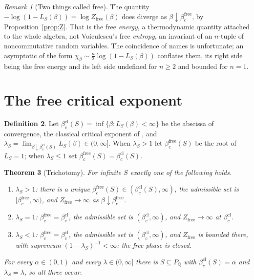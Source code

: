 \documentclass[11pt]{amsart}
\numberwithin{equation}{section}
\newtheorem{theorem}{Theorem}[section]
\theoremstyle{definition}
\newtheorem{definition}[theorem]{Definition}
\theoremstyle{remark}
\newtheorem{remark}[theorem]{Remark}
\newcommand{\Q}{\mathbb{Q}}
\newcommand{\bfree}{\beta_c^{\mathrm{free}}}
\newcommand{\bcl}{\beta_c^{\mathrm{cl}}}
\begin{document}
\begin{remark}[Two things called free]\label{rem:freeenergy}
The quantity $-\log(1-L_S(\beta))=\log Z_{\mathrm{free}}(\beta)$ does diverge as
$\beta\downarrow\bfree$, by Proposition~\ref{prop:Z}. That is the free \emph{energy}, a
thermodynamic quantity attached to the whole algebra, not Voiculescu's free \emph{entropy},
an invariant of an $n$-tuple of noncommutative random variables. The coincidence of names is
unfortunate; an asymptotic of the form $\chi_\beta\sim\frac n2\log(1-L_S(\beta))$ conflates
them, its right side being the free energy and its left side undefined for $n\ge2$ and
bounded for $n=1$.
\end{remark}

\section{The free critical exponent}

\begin{definition}\label{def:bfree}
Let $\bcl(S)=\inf\{\beta:L_S(\beta)<\infty\}$ be the abscissa of convergence, the classical
critical exponent of \cite{Main}, and
$\lambda_S=\lim_{\beta\downarrow\bcl(S)}L_S(\beta)\in(0,\infty]$. When $\lambda_S>1$ let
$\bfree(S)$ be the root of $L_S=1$; when $\lambda_S\le1$ set $\bfree(S)=\bcl(S)$.
\end{definition}

\begin{theorem}[Trichotomy]\label{thm:trich}
For infinite $S$ exactly one of the following holds.
\begin{enumerate}
\item[\textup{(S)}] $\lambda_S>1$: there is a unique $\bfree(S)\in(\bcl(S),\infty)$, the
admissible set is $[\bfree,\infty)$, and $Z_{\mathrm{free}}\to\infty$ as
$\beta\downarrow\bfree$.
\item[\textup{(C)}] $\lambda_S=1$: $\bfree=\bcl$, the admissible set is $(\bcl,\infty)$, and
$Z_{\mathrm{free}}\to\infty$ at $\bcl$.
\item[\textup{(B)}] $\lambda_S<1$: $\bfree=\bcl$, the admissible set is $(\bcl,\infty)$, and
$Z_{\mathrm{free}}$ is \emph{bounded} there, with supremum $(1-\lambda_S)^{-1}<\infty$: the
free phase is closed.
\end{enumerate}
For every $\alpha\in(0,1)$ and every $\lambda\in(0,\infty]$ there is $S\subseteq P_\Q$ with
$\bcl(S)=\alpha$ and $\lambda_S=\lambda$, so all three occur.
\end{theorem}
\end{document}

